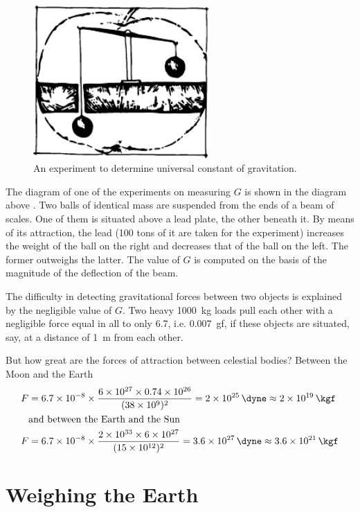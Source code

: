  \begin{figure}[!ht]
 \centering
 \includegraphics[width=0.6\textwidth]{figures/fig-6-1.pdf}
 \caption{An experiment to determine universal constant of gravitation.}
 \label{fig-6-1}
 \end{figure}
The diagram of one of the experiments on measuring
$G$ is shown in the diagram above . Two balls of identical mass are
suspended from the ends of a beam of scales. One of them
is situated above a lead plate, the other beneath it. By
means of its attraction, the lead (100 tons of it are taken
for the experiment) increases the weight of the ball on the
right and decreases that of the ball on the left. The former outweighs the latter. The value of $G$ is computed on the
basis of the magnitude of the deflection of the beam.

The difficulty in detecting gravitational forces between two objects is explained by the negligible value of $G$.
Two heavy \SI{1000}{\kilo\gram} loads pull each other with a negligible force equal in all to only \SI{6.7}{\dyne}, i.e. 0.007~gf, if these
objects are situated, say, at a distance of \SI{1}{\meter} from each other.

But how great are the forces of attraction between celestial bodies? Between the Moon and the Earth
 \begin{align*}%
F & =  \num{6.7e-8} \times \dfrac{\num{6e27} \times 0.74 \times \num{d26}}{(\num{38e9})^{2}}  = \SI{2e25}{\dyne} \approx \SI{2e19}{\kgf}\\
& \text{and between the Earth and the Sun}\\
F & =  \num{6.7e-8} \times \dfrac{\num{2e33} \times 6 \times \num{d27}}{(\num{15e12})^{2}}  = \SI{3.6e27}{\dyne} \approx \SI{3.6e21}{\kgf}
 \end{align*}

\section{Weighing the Earth}


